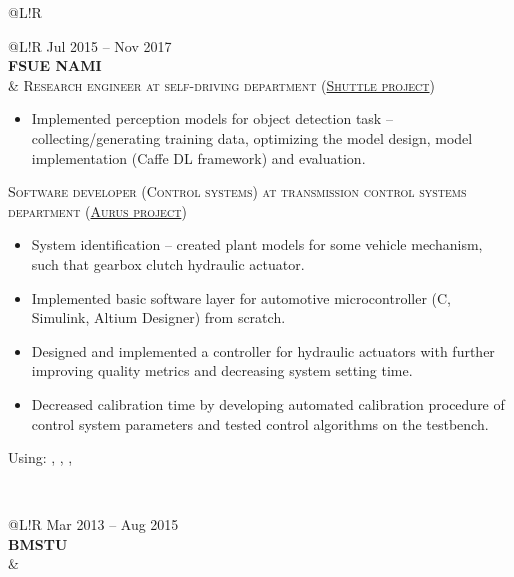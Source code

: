 \begin{tabular}{@{}L!{\VRule}R}
 \begin{tabular}{@{}L!{\VRule}R}
    Jul 2015 -- Nov 2017                                                                                                       \\ {\bf FSUE NAMI} \\  &
    {\textsc{Research engineer at self-driving department (\href{https://www.engadget.com/2016/08/28/yandex-teams-on-self-driving-shuttle-bus/}{Shuttle project})}}
    \begin{itemize}
        \item Implemented perception models for object detection task -- collecting/generating training data, optimizing the model design, model implementation (Caffe DL framework) and evaluation.
    \end{itemize}
    \textsc{Software developer (Control systems) at transmission control systems department (\href{https://en.wikipedia.org/wiki/Aurus_Senat}{Aurus project})}
    \begin{itemize}
        \item System identification -- created plant models for some vehicle mechanism, such that gearbox clutch hydraulic actuator.
        \item Implemented basic software layer for automotive microcontroller (C, Simulink, Altium Designer) from scratch.
        \item Designed and implemented a controller for hydraulic actuators with further improving quality metrics and decreasing system setting time.
        \item Decreased calibration time by developing automated calibration procedure of control system parameters and tested control algorithms on the testbench.
    \end{itemize}
    Using: , , ,                                                                                          \\  
\end{tabular}                                                                                                \\
\begin{tabular}{@{}L!{\VRule}R} 
    Mar 2013 -- Aug 2015                                                                                                       \\ {\bf BMSTU \\ } &

\end{tabular}
\end{tabular}
